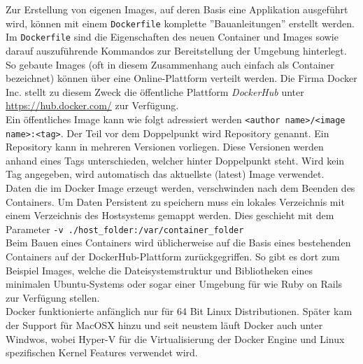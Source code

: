 Zur Erstellung von eigenen Images, auf deren Basis eine Applikation ausgeführt wird, können mit einem \lstinline[]|Dockerfile| komplette ''Bauanleitungen'' erstellt werden. Im \lstinline[]|Dockerfile| sind die Eigenschaften des neuen Container und Images sowie darauf auszuführende Kommandos zur Bereitstellung der Umgebung hinterlegt. \\

So gebaute Images (oft in diesem Zusammenhang auch einfach als Container bezeichnet) können über eine Online-Plattform verteilt werden. Die Firma Docker Inc. stellt zu diesem Zweck die öffentliche Plattform \emph{DockerHub} unter \url{https://hub.docker.com/} zur Verfügung. \\

Ein öffentliches Image kann wie folgt adressiert werden \lstinline[]|<author name>/<image name>:<tag>|. Der Teil vor dem Doppelpunkt wird Repository genannt. Ein Repository kann in mehreren Versionen vorliegen. Diese Versionen werden anhand eines Tags unterschieden, welcher hinter Doppelpunkt steht. Wird kein Tag angegeben, wird automatisch das aktuellste (latest) Image verwendet. \\

Daten die im Docker Image erzeugt werden, verschwinden nach dem Beenden des Containers. Um Daten Persistent zu speichern muss ein lokales Verzeichnis mit einem Verzeichnis des Hostsystems gemappt werden. Dies geschieht mit dem Parameter \lstinline[]|-v ./host_folder:/var/container_folder| \\

Beim Bauen eines Containers wird üblicherweise auf die Basis eines bestehenden Containers auf der DockerHub-Plattform zurückgegriffen. So gibt es dort zum Beispiel Images, welche die Dateisystemstruktur und Bibliotheken eines minimalen Ubuntu-Systems oder sogar einer Umgebung für  wie Ruby on Rails zur Verfügung stellen. \\

Docker funktionierte anfänglich nur für 64 Bit Linux Distributionen. Später kam der Support für MacOSX hinzu und seit neustem läuft Docker auch unter Windwos, wobei Hyper-V für die Virtualisierung der Docker Engine und Linux spezifischen Kernel Features verwendet wird.

